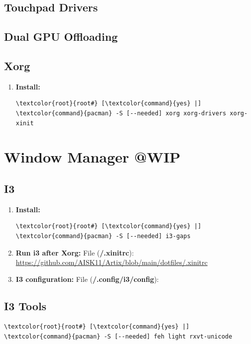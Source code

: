 \documentclass[10pt, a4paper, onecolumn, oneside, titlepage, openany]{book}
\begin{document}
\section{Touchpad Drivers}

\section{Dual GPU Offloading}

\section{Xorg}
\begin{enumerate}
    \item \textbf{Install:}
\begin{Verbatim}[commandchars=\\\{\}]
\textcolor{root}{root#} [\textcolor{command}{yes} |] \textcolor{command}{pacman} -S [--needed] xorg xorg-drivers xorg-xinit
\end{Verbatim}
\end{enumerate}


\chapter{Window Manager @WIP}
\section{I3}
\begin{enumerate}
    \item \textbf{Install:}
\begin{Verbatim}[commandchars=\\\{\}]
\textcolor{root}{root#} [\textcolor{command}{yes} |] \textcolor{command}{pacman} -S [--needed] i3-gaps
\end{Verbatim}
    \item \textbf{Run i3 after Xorg:}
\newline File (\textbf{\textcolor{file}{\texttildelow/.xinitrc}}):
\newline \url{https://github.com/AISK11/Artix/blob/main/dotfiles/.xinitrc}
    \item \textbf{I3 configuration:}
\newline File (\textbf{\textcolor{file}{\texttildelow/.config/i3/config}}):
\newline \url{}    
\end{enumerate}
\section{I3 Tools}
\begin{Verbatim}[commandchars=\\\{\}]
\textcolor{root}{root#} [\textcolor{command}{yes} |] \textcolor{command}{pacman} -S [--needed] feh light rxvt-unicode
\end{Verbatim}
\end{document}
